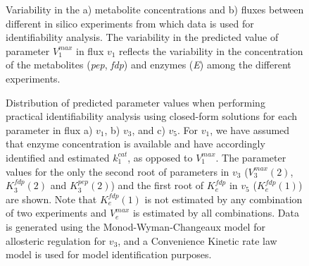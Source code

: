 \documentclass[10pt]{article}
\begin{document}
	\begin{figure}[!tbhp]
		\caption{Variability in the a) metabolite concentrations and b) fluxes between different in silico experiments from which data is used for identifiability analysis. The variability in the predicted value of parameter $V_1^{max}$ in flux $v_1$ reflects the variability in the concentration of the metabolites (\textit{pep}, \textit{fdp}) and enzymes (\textit{E}) among the different experiments.}\label{fig:experimental_data_dist}
	\end{figure}	

	\begin{figure}[!tbhp]
		\caption{Distribution of predicted parameter values when performing practical identifiability analysis using closed-form solutions for each parameter in flux a) $v_1$, b) $v_3$, and c) $v_5$. For $v_1$, we have assumed that enzyme concentration is available and have accordingly identified and estimated $k_1^{cat}$, as opposed to $V_1^{max}$. The parameter values for the only the second root of parameters in $v_3$ ($V_3^{max}(2)$, $K_3^{fdp}(2)$ and $K_3^{pep}(2)$) and the first root of $K_e^{fdp}$ in $v_5$ ($K_e^{fdp}(1)$) are shown. Note that $K_e^{fdp}(1)$ is not estimated by any combination of two experiments and $V_e^{max}$ is estimated by all combinations. Data is generated using the Monod-Wyman-Changeaux model for allosteric regulation for $v_3$, and a Convenience Kinetic rate law model is used for model identification purposes.}\label{fig:parameter_value_v1_kcat}
	\end{figure}	
\end{document}
